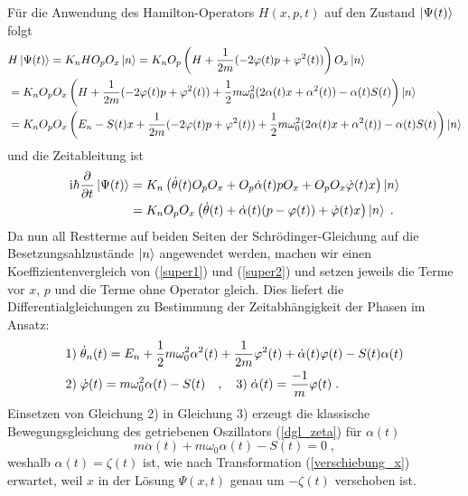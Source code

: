   Für die Anwendung des Hamilton-Operators $H(x,p,t)$ auf den Zustand $\ket{\Psi(t)}$ folgt
  \begin{align}
    &H\ket{\Psi(t)}=K_nHO_pO_x\ket{n}
    =K_nO_p\left(H+\frac{1}{2m}(-2\varphi(t)p+\varphi^2(t))\right)O_x\ket{n} \notag\\
    &=K_nO_pO_x\left(H+\frac{1}{2m}(-2\varphi(t)p+\varphi^2(t))+\frac{1}{2}m\omega_0^2(2\alpha(t)x+\alpha^2(t))-\alpha(t)S(t)\right)\ket{n} \notag\\
    &=K_nO_pO_x
    \left(E_n-S(t)x+\frac{1}{2m}(-2\varphi(t)p+\varphi^2(t))+\frac{1}{2}m\omega_0^2(2\alpha(t)x+\alpha^2(t))-\alpha(t)S(t)\right)\ket{n}
    \label{super1}
  \end{align}
  und die Zeitableitung ist
  \begin{align}
    \text i\hbar\frac{\partial}{\partial t} \ket{\Psi(t)}
    &=K_n\left(\dot\theta(t)O_pO_x+O_p\dot\alpha(t)pO_x+O_pO_x\dot\varphi(t)x\right)\ket{n} \notag\\
    &=K_nO_pO_x\left(\dot\theta(t)+\dot\alpha(t)(p-\varphi(t))+\dot\varphi(t)x\right)\ket{n} \; .
    \label{super2}
  \end{align}
  Da nun all Restterme auf beiden Seiten der Schrödinger-Gleichung auf die Besetzungsahlzustände $\ket{n}$ angewendet werden, machen wir einen Koeffizientenvergleich von (\ref{super1}) und (\ref{super2}) und setzen jeweils die Terme vor $x$, $p$ und die Terme ohne Operator gleich.
  Dies liefert die Differentialgleichungen zu Bestimmung der Zeitabhängigkeit der Phasen im Ansatz:
  \begin{align}
    &1)\; \dot\theta_n(t)=E_n+\frac 1 2 m\omega_0^2\alpha^2(t)+\frac{1}{2m}\varphi^2(t)+\dot\alpha(t)\varphi(t)-S(t)\alpha(t) \notag\\
    &2)\; \dot\varphi(t)=m\omega_0^2\alpha(t)-S(t) \quad,\quad 3) \;\dot\alpha(t)=\frac{-1}{m}\varphi(t) \;.
  \end{align}
  Einsetzen von Gleichung 2) in Gleichung 3) erzeugt die klassische Bewegungsgleichung des getriebenen Oszillators (\ref{dgl_zeta}) für $\alpha(t)$
  \begin{equation}
    m\ddot\alpha(t)+m\omega_0\alpha(t)-S(t)=0 \;,
  \end{equation}
  weshalb $\alpha(t)=\zeta(t)$ ist, wie nach Transformation (\ref{verschiebung_x}) erwartet, weil $x$ in der Lösung $\Psi(x,t)$ genau um $-\zeta(t)$ verschoben ist.

